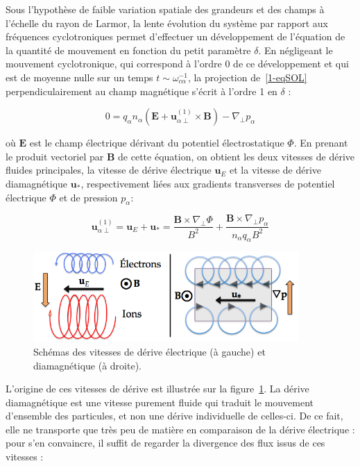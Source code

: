 \begin{refsection}
 Sous l'hypothèse de faible variation spatiale des grandeurs et des champs à
 l'échelle du rayon de Larmor, la lente évolution du système par rapport aux
 fréquences cyclotroniques permet d'effectuer un développement de l'équation de
 la quantité de mouvement en fonction du petit paramètre $\delta$. En négligeant
 le mouvement cyclotronique, qui correspond à l'ordre 0 de ce développement et qui
 est de moyenne nulle sur un temps $t\sim\omega_{c\alpha}^{-1}$, la projection
 de~\eqref{1-eqSOL} perpendiculairement au champ magnétique s'écrit à l'ordre 1
 en $\delta$ :
 
 \begin{equation}
\label{1-eqSOLperp}
0
={q_\alpha n_\alpha}\left(\mathbf E+\mathbf
u_{\alpha\perp}^{(1)}\times \mathbf B\right)
-{\nabla_\perp p_\alpha}
\end{equation}

où $\mathbf E$ est le champ électrique dérivant du potentiel électrostatique
$\Phi$. En prenant le produit vectoriel par $\mathbf B$ de cette équation, on
obtient les deux vitesses de dérive fluides principales, la vitesse de dérive
électrique $\mathbf u_E$ et la vitesse de dérive diamagnétique $\mathbf u_*$,
respectivement liées aux gradients transverses de potentiel électrique $\Phi$ et
de pression $p_\alpha$:

\begin{equation}
\label{1-eqVitessesDerive}
\mathbf u_{\alpha\perp}^{(1)}=\mathbf u_E+\mathbf u_*=\frac{\mathbf
B\times\nabla_\perp \Phi}{B^2}+\frac{\mathbf B\times\nabla_\perp
p_\alpha}{n_\alpha q_\alpha B^2}
\end{equation}

\begin{figure}[!htbp]
    \centering
	\includegraphics[width=0.9\textwidth]{figures/1-vitessesDerive.png}
	\caption{Schémas des vitesses de dérive électrique (à gauche) et diamagnétique
	(à droite).}
	\label{1-vitessesDerive}
\end{figure}

L'origine de ces vitesses de dérive est illustrée sur la
figure~\ref{1-vitessesDerive}. La dérive diamagnétique est une vitesse
purement fluide qui traduit le mouvement d'ensemble des particules, et non
une dérive individuelle de celles-ci. De ce fait, elle ne transporte que
très peu de matière en comparaison de la dérive électrique : pour s'en
convaincre, il suffit de regarder la divergence des flux issus de ces
vitesses :


\end{refsection}
